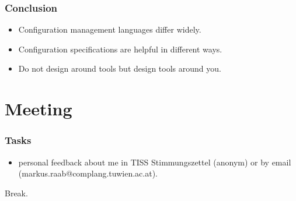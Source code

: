 \begin{frame}
	\frametitle{Conclusion}

	\begin{itemize}[<+-| alert@+>]
	\item Configuration management languages differ widely.
	\item Configuration specifications are helpful in different ways.
	\item Do not design around tools but design tools around you.
	\end{itemize}
\end{frame}

\section{Meeting}


\begin{assignment}
	\frametitle{Tasks}

	\begin{task}
	\begin{itemize}[<+-| alert@+>]
	\item personal feedback about me in TISS Stimmungszettel (anonym) or by email (markus.raab@complang.tuwien.ac.at).
	\end{itemize}
	\end{task}
\end{assignment}


\begin{assignment}
	\begin{task}
	Break.
	\end{task}
\end{assignment}


\nocite{raab2017introducing}

\appendix

\begin{frame}[allowframebreaks]
	
	
\end{frame}



